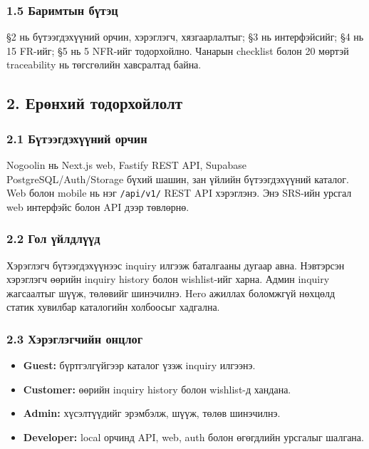 \documentclass[
  mongolian,
]{article}
\providecommand{\tightlist}{%
  \setlength{\itemsep}{0pt}\setlength{\parskip}{0pt}}
\begin{document}
\subsubsection{1.5 Баримтын
бүтэц}\label{ux431ux430ux440ux438ux43cux442ux44bux43d-ux431ux4afux442ux44dux446}

§2 нь бүтээгдэхүүний орчин, хэрэглэгч, хязгаарлалтыг; §3 нь
интерфэйсийг; §4 нь 15 FR-ийг; §5 нь 5 NFR-ийг тодорхойлно. Чанарын
checklist болон 20 мөртэй traceability нь төгсгөлийн хавсралтад байна.

\subsection{2. Ерөнхий
тодорхойлолт}\label{ux435ux440ux4e9ux43dux445ux438ux439-ux442ux43eux434ux43eux440ux445ux43eux439ux43bux43eux43bux442}

\subsubsection{2.1 Бүтээгдэхүүний
орчин}\label{ux431ux4afux442ux44dux44dux433ux434ux44dux445ux4afux4afux43dux438ux439-ux43eux440ux447ux438ux43d}

Nogoolin нь Next.js web, Fastify REST API, Supabase
PostgreSQL/Auth/Storage бүхий шашин, зан үйлийн бүтээгдэхүүний каталог.
Web болон mobile нь нэг \texttt{/api/v1/} REST API хэрэглэнэ. Энэ
SRS-ийн урсгал web интерфэйс болон API дээр төвлөрнө.

\subsubsection{2.2 Гол
үйлдлүүд}\label{ux433ux43eux43b-ux4afux439ux43bux434ux43bux4afux4afux434}

Хэрэглэгч бүтээгдэхүүнээс inquiry илгээж баталгааны дугаар авна.
Нэвтэрсэн хэрэглэгч өөрийн inquiry history болон wishlist-ийг харна.
Админ inquiry жагсаалтыг шүүж, төлөвийг шинэчилнэ. Hero ажиллах
боломжгүй нөхцөлд статик хувилбар каталогийн холбоосыг хадгална.

\subsubsection{2.3 Хэрэглэгчийн
онцлог}\label{ux445ux44dux440ux44dux433ux43bux44dux433ux447ux438ux439ux43d-ux43eux43dux446ux43bux43eux433}

\begin{itemize}
\tightlist
\item
  \textbf{Guest:} бүртгэлгүйгээр каталог үзэж inquiry илгээнэ.
\item
  \textbf{Customer:} өөрийн inquiry history болон wishlist-д хандана.
\item
  \textbf{Admin:} хүсэлтүүдийг эрэмбэлж, шүүж, төлөв шинэчилнэ.
\item
  \textbf{Developer:} local орчинд API, web, auth болон өгөгдлийн
  урсгалыг шалгана.
\end{itemize}
\end{document}
